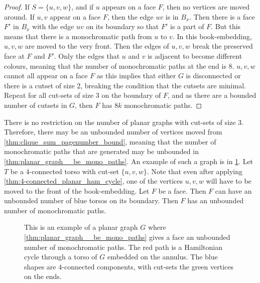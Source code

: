 \begin{proof}
	If $S = \{u,v,w\}$, and if $u$ appears on a face $F$, then no vertices are moved around. If $u,v$ appear on a face $F$, then the edge $uv$ is in $B_x$. Then there is a face $F'$ in $B_x$ with the edge $uv$ on its boundary so that $F'$ is a part of $F$. But this means that there is a monochromatic path from $u$ to $v$. In this book-embedding, $u,v,w$ are moved to the very front. Then the edges of $u,v,w$ break the preserved face at $F$ and $F'$. Only the edges that $u$ and $v$ is adjacent to become different colours, meaning that the number of monochromatic paths at the end is $8$. 
	$u,v,w$ cannot all appear on a face $F$ as this implies that either $G$ is disconnected or there is a cutset of size $2$, breaking the condition that the cutsets are minimal. 
	Repeat for all cut-sets of size $3$ on the boundary of $F$, and as there are a bounded number of cutsets in $G$, then $F$ has $8k$ monochromatic paths.

\end{proof}	


There is no restriction on the number of planar graphs with cut-sets of size $3$. Therefore, there may be an unbounded number of vertices moved from \cref{thm:clique_sum_pagenumber_bound}, meaning that the number of monochromatic paths that are generated may be unbounded in \cref{thm:planar_graph__be_mono_paths}. An example of such a graph is in \cref{fig:moved_vertices}. Let $T$ be a 4-connected torso with cut-set $\{u,v,w\}$. Note that even after applying \cref{thm:4-connected_planar_ham_cycle}, one of the vertices $u,v,w$ will have to be moved to the front of the book-embedding. 
Let $F$ be a face. Then $F$ can have an unbounded number of blue torsos on its boundary. Then $F$ has an unbounded number of monochromatic paths.


\begin{figure}[h!]
	\centering
	
	\caption[Counterexample to bounded number of moved vertices]{This is an example of a planar graph $G$ where \cref{thm:planar_graph__be_mono_paths} gives a face an unbounded number of monochromatic paths. The red path is a Hamiltonian cycle through a torso of $G$ embedded on the annulus. The blue shapes are $4$-connected components, with cut-sets the green vertices on the ends.}\label{fig:moved_vertices}
\end{figure}